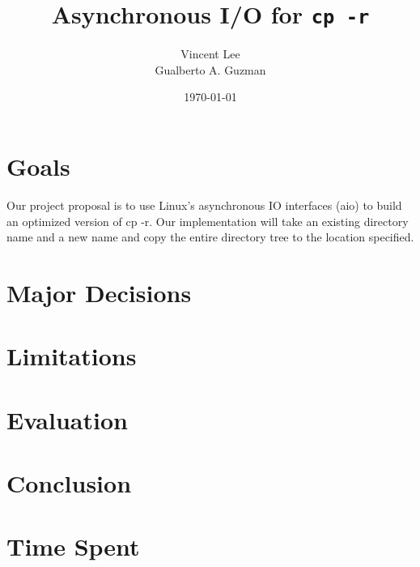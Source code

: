 \documentclass[11pt]{article}
\begin{document}
\title{Asynchronous I/O for \texttt{cp -r}}
\date{\today}
\author{Vincent Lee \\
        Gualberto A. Guzman}

\maketitle

\section{Goals}
Our project proposal is to use Linux's asynchronous IO interfaces (aio) to build an optimized
version of cp -r. Our implementation will take an existing directory name and a new name and
copy the entire directory tree to the location specified.

\section{Major Decisions}

\section{Limitations}

\section{Evaluation}

\section{Conclusion}

\section{Time Spent}
\end{document}
